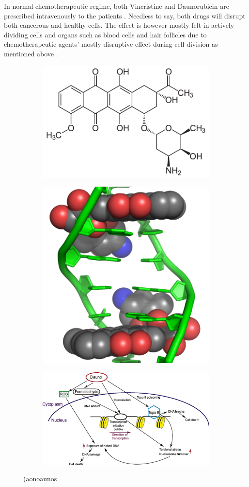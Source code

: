 \documentclass[pdftex,12pt,a4paper]{report}
\begin{document}
In normal chemotherapeutic regime, both Vincristine and Daunorubicin are prescribed intravenously to the patients \cite{skeel2011handbook}. Needless to say, both drugs will disrupt both cancerous and healthy cells. The effect is however mostly felt in actively dividing cells and organs such as blood cells  and hair follicles due to chemotherapeutic agents' mostly disruptive effect during cell division as mentioned above \cite{skeel2011handbook, mayo2018chemotherapy}.

\begin{figure}[H]
\centering
\begin{subfigure}{.8\textwidth}
  \centering
  \includegraphics[width=.5\textwidth]{images/daunorubicin}
  \caption{}
  \label{fig:dauno}
\end{subfigure}
\centering
\begin{subfigure}{.8\textwidth}
  \centering
  \includegraphics[width=.5\textwidth]{images/doxorubicin_dna}
  \caption{}
  \label{fig:anthracyclines_dna}
\end{subfigure}
\centering
\begin{subfigure}{.9\textwidth}
  \centering
  \includegraphics[width=.8\textwidth]{images/daunorubicin_mechanism}
  \caption{}
  \label{fig:dauno_mechanism}
\end{subfigure}
\caption{(aonoaunos}
\end{figure}
\end{document}
